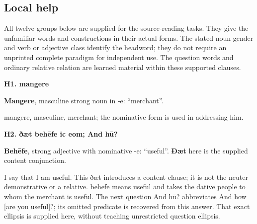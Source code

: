 \subsection*{Local help}

All twelve groups below are supplied for the source-reading tasks. They give the unfamiliar words and constructions in their actual forms. The stated noun gender and verb or adjective class identify the headword; they do not require an unprinted complete paradigm for independent use. The question words and ordinary relative relation are learned material within these supported clauses.

\par\begin{minipage}{\linewidth}\raggedright
\textbf{H1. mangere}

\textbf{Mangere}, masculine strong noun in -e: “merchant”.

mangere, masculine, merchant; the nominative form is used in addressing him.

\end{minipage}\par\addvspace{4pt}

\par\begin{minipage}{\linewidth}\raggedright
\textbf{H2. ðæt behēfe ic eom; And hū?}

\textbf{Behēfe}, strong adjective with nominative -e: “useful”. \textbf{Ðæt} here is the supplied content conjunction.

I say that I am useful. This ðæt introduces a content clause; it is not the neuter demonstrative or a relative. behēfe means useful and takes the dative people to whom the merchant is useful. The next question And hū? abbreviates And how [are you useful]?; its omitted predicate is recovered from this answer. That exact ellipsis is supplied here, without teaching unrestricted question ellipsis.

\end{minipage}\par\addvspace{4pt}


